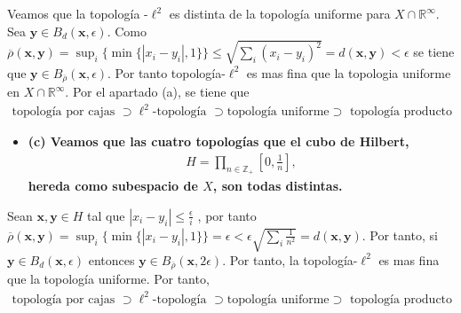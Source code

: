 \documentclass{article}
\newcommand{\vect}[1]{\boldsymbol{#1}}
\begin{document}
Veamos que la topología -$\ell^2$ es distinta de la topología uniforme para $X\cap\mathbb{R}^\infty$. Sea $\vect{y}\in B_{d}(\vect{x},\epsilon)$. Como $\overline{\rho}(\vect{x},\vect{y})=\sup_i\{\min\{|x_i-y_i|,1\}\}\leq \sqrt{\sum_i (x_i-y_i)^2}=d(\vect{x},\vect{y})<\epsilon$
se tiene que $\vect{y}\in B_{\overline{\rho}}(\vect{x},\epsilon)$. Por tanto topología-$\ell^2$ es mas fina que la topologia uniforme en $X\cap\mathbb{R}^\infty$. Por el apartado (a), se tiene que
\begin{eqnarray}
\text{topología por cajas }\supset\ell^2\text{-topología }\supset \text{topología uniforme}\supset\text{ topología producto }\nonumber
\end{eqnarray}
\begin{itemize}
\item \bf (c) \rm Veamos que las cuatro topologías que el cubo de Hilbert,
\begin{eqnarray}
H=\prod_{n\in \mathbb{Z}_+}\left[0,\frac{1}{n}\right],\nonumber
\end{eqnarray}
hereda como subespacio de $X$, son todas distintas.
\end{itemize}
Sean $\vect{x},\vect{y}\in H$ tal que $|x_i-y_i|\leq\frac{\epsilon}{i}$ , por tanto $\overline{\rho}(\vect{x},\vect{y})=\sup_i\{\min\{|x_i-y_i|,1\}\}= \epsilon<\epsilon \sqrt{\sum_i\frac{1}{n^2}}=d(\vect{x},\vect{y})$. Por tanto, si $\vect{y}\in B_{d}(\vect{x},\epsilon)$ entonces $\vect{y}\in B_{\overline{\rho}}(\vect{x},2\epsilon)$. Por tanto, la topología-$\ell^2$ es mas fina que la topología uniforme. Por tanto,
\begin{eqnarray}
\text{topología por cajas }\supset\ell^2\text{-topología }\supset \text{topología uniforme}\supset\text{ topología producto }\nonumber
\end{eqnarray}
\end{document}
